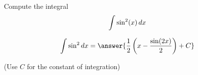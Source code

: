 \documentclass{ximera}
\author{Jason Miller}
\begin{document}
\begin{exercise}
Compute the integral
\[
\int \sin^{2} (x)  \mathop{}\!d x 
\]


\[
\int \sin^{2} \d x=\answer{\frac{1}{2} \left( x- \frac{ \sin(2x)}{2} \right) +C}
\]

(Use $C$ for the constant of integration)

\end{exercise}
\end{document}
